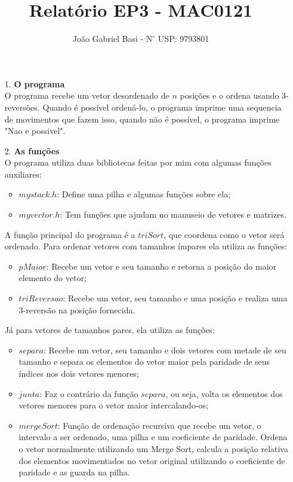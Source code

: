 \documentclass[12pt, a4paper]{article} %
\title{Relatório EP3 - MAC0121}
\date{}
\author{João Gabriel Basi - $\text{N}^\circ$ USP: 9793801}
\begin{document}
\maketitle
\begin{enumerate}
\large
\item[1.]\textbf{O programa}
\normalsize\\[0.5cm]
O programa recebe um vetor desordenado de $n$ posições e o ordena usando 3-reversões. Quando é possível ordená-lo, o programa imprime uma sequencia de movimentos que fazem isso, quando não é possível, o programa imprime "Nao e possivel".\\[0.5cm]
\large
\item[2.]\textbf{As funções}
\normalsize\\[0.5cm]
O programa utiliza duas bibliotecas feitas por mim com algumas funções auxiliares:
\begin{itemize}
\item $mystack.h$: Define uma pilha e algumas funções sobre ela;
\item $myvector.h$: Tem funções que ajudam no manuseio de vetores e matrizes.
\end{itemize}
A função principal do programa é a $triSort$, que coordena como o vetor será ordenado. Para ordenar vetores com tamanhos ímpares ela utiliza as funções:
\begin{itemize}
\item $pMaior$: Recebe um vetor e seu tamanho e retorna a posição do maior elemento do vetor;
\item $triReversao$: Recebe um vetor, seu tamanho e uma posição e realiza uma 3-reversão na posição fornecida.
\end{itemize}
Já para vetores de tamanhos pares, ela utiliza as funções:
\begin{itemize}
\item $separa$: Recebe um vetor, seu tamanho e dois vetores com metade de seu tamanho e separa os elementos do vetor maior pela paridade de seus índices nos dois vetores menores;
\item $junta$: Faz o contrário da função $separa$, ou seja, volta os elementos dos vetores menores para o vetor maior intercalando-os;
\item $mergeSort$: Função de ordenação recursiva que recebe um vetor, o intervalo a ser ordenado, uma pilha e um coeficiente de paridade. Ordena o vetor normalmente utilizando um Merge Sort, calcula a posição relativa dos elementos movimentados no vetor original utilizando o coeficiente de paridade e as guarda na pilha.\\[2cm]

\end{itemize}
\end{enumerate}
\end{document}
